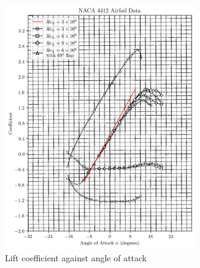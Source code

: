 \documentclass{article}
\begin{document}
\begin{figure}[H]
    \centering
    \captionsetup{justification=centering}
    \begin{subfigure}{0.45\textwidth}
        \includegraphics[width=0.9\textwidth]{figures/NACA4412_lift_validation.png}
        \caption{Lift coefficient against angle of attack}
        \label{fig:4412_lift_validation}
    \end{subfigure}
    \begin{subfigure}{0.45\textwidth}
        \centering

\end{subfigure}
\end{figure}
\end{document}
